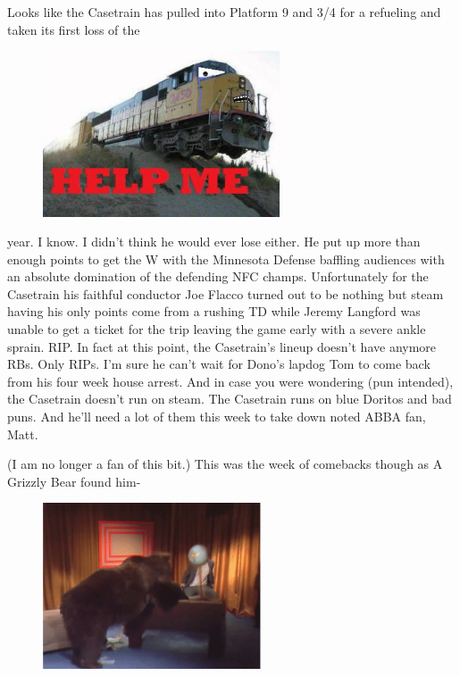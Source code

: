 \documentclass[11pt,letterpaper]{article}
\begin{document}
\newpage
{}
\par\noindent Looks like the Casetrain has pulled into Platform 9 and 3/4 for a refueling and taken its first loss of the 
\begin{figure}
\centering
\includegraphics[width=0.625\textwidth]{week3-train.png}
\label{fig:week3-train}
\end{figure} 
\par\noindent year. I know. I didn't think he would ever lose either. He put up more than enough points to get the W with the Minnesota Defense baffling audiences with an absolute domination of the defending NFC champs. Unfortunately for the Casetrain his faithful conductor Joe Flacco turned out to be nothing but steam having his only points come from a rushing TD while Jeremy Langford was unable to get a ticket for the trip leaving the game early with a severe ankle sprain. RIP. In fact at this point, the Casetrain's lineup doesn't have anymore RBs. Only RIPs. I’m sure he can't wait for Dono's lapdog Tom to come back from his four week house arrest. And in case you were wondering (pun intended), the Casetrain doesn't run on steam. The Casetrain runs on blue Doritos and bad puns. And he'll need a lot of them this week to take down noted ABBA fan, Matt. 
\bigskip
\par\noindent (I am no longer a fan of this bit.) This was the week of comebacks though as A Grizzly Bear found him-
\begin{figure}
\centering
\includegraphics[width=0.575\textwidth]{week3-bear.png}
\label{fig:week3-bear}
\end{figure} 
\end{document}
